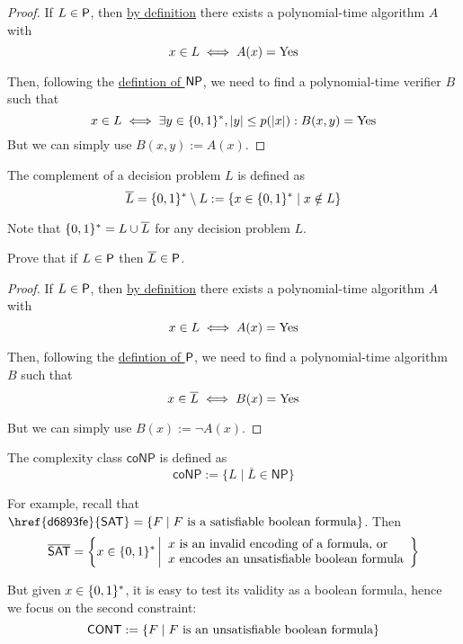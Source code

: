 \begin{proof}
  If $L\in\P$, then \href{ee3be28}{by definition} there exists a polynomial-time algorithm $A$ with
  $$x\in L\iff A(x)=\Yes$$

  Then, following the \href{d93050e}{defintion of $\NP$}, we need to find a
  polynomial-time verifier $B$ such that
  $$
    x\in L\iff\exists y\in\binrep,|y|\leq p(|x|):B(x,y)=\Yes
  $$
  But we can simply use $B(x,y):=A(x)$.
\end{proof}

\label{f636043}

The complement of a decision problem $L$ is defined as
$$
  \overline L=\binrep\setminus L:=\{x\in\binrep\mid x\notin L\}
$$

Note that $\binrep=L\cup\overline L$ for any decision problem $L$.

\label{da1567b}

Prove that if $L\in\P$ then $\overline L\in\P$.

\begin{proof}
  If $L\in\P$, then \href{ee3be28}{by definition} there exists a
  polynomial-time algorithm $A$ with $$x\in L\iff A(x)=\Yes$$

  Then, following the \href{ee3be28}{defintion of $\P$}, we need to find a
  polynomial-time algorithm $B$ such that
  $$x\in\overline L\iff B(x)=\Yes$$

  But we can simply use $B(x):=\neg A(x)$.
\end{proof}

\label{a92ed96}

The complexity class $\mathsf{coNP}$ is defined as
$$
  \mathsf{coNP}:=\{L\mid\overline L\in\mathsf{NP}\}
$$

For example, recall that $\mathsf{\href{d6893fe}{SAT}}=\{F\mid F\text{ is a
  satisfiable boolean formula}\}$. Then
$$
  \overline{\SAT}=\left\{x\in\binrep\, \middle\vert
  \begin{array}{l}
    \text{$x$ is an invalid encoding of a formula, or} \\
    \text{$x$ encodes an unsatisfiable boolean formula}
  \end{array}
  \right\}
$$

But given $x\in\binrep$, it is easy to test its validity as a boolean formula,
hence we focus on the second constraint:
$$
  \CONT:=\{F\mid F\text{ is an unsatisfiable boolean formula}\}
$$

